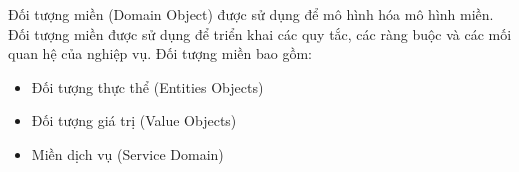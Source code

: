 Đối tượng miền (Domain Object)    được sử dụng để mô hình hóa    mô hình miền.  Đối tượng miền    được sử dụng để   triển khai   các quy tắc, các ràng buộc và các mối quan hệ   của nghiệp vụ.
Đối tượng miền   bao gồm:





\begin{itemize}
\item Đối tượng thực thể (Entities Objects)  
\item Đối tượng giá trị (Value Objects) 
\item  Miền dịch vụ (Service Domain) 

\end{itemize}

 
 
 

 